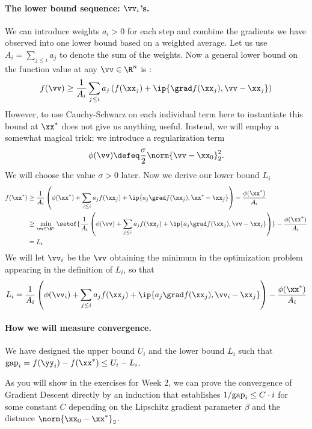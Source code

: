 \paragraph{The lower bound sequence: $\vv_i$'s.}
We can introduce weights $a_i > 0$ for each step and combine the
gradients we have observed into one lower bound based on a weighted
average. Let us use $A_i = \sum_{j \leq i} a_j$ to denote the sum of
the weights. Now a general lower bound on the function value at any
$\vv \in \R^n$ is
:
\[
 f(\vv)
 \geq
 \frac{1}{A_i}
 \sum_{j \leq i} a_j \left(  f(\xx_j)
   + \ip{\grad
     f(\xx_j) , \vv - \xx_j}
   \right)
 \]
However, to use Cauchy-Schwarz on each individual term here to
instantiate this bound at $\xx^*$ does not give us anything useful.
Instead, we will employ a somewhat magical trick: we introduce a
regularization term
\[
  \phi(\vv) \defeq \frac{\sigma}{2} \norm{ \vv -
    \xx_0}_2^2
  .
\]
We will choose the value $\sigma > 0$ later.
Now  we derive our lower bound $L_i$
\begin{align*}
 f(\xx^*)
 &\geq
   \frac{1}{A_i}
    \left(
\phi(\xx^*)
 +
 \sum_{j \leq i} a_j  f(\xx_j)
   + \ip{ a_j\grad
     f(\xx_j) , \xx^* - \xx_j}
\right)
 -
\frac{\phi(\xx^*)}{A_i}
   \\
  &\geq
    \min_{\vv \in \R^n} \setof{
   \frac{1}{A_i}
    \left(
\phi(\vv)
 +
 \sum_{j \leq i} a_j  f(\xx_j)
   + \ip{ a_j\grad
     f(\xx_{j}) ,\vv - \xx_j}
 \right)
    }
    -
    \frac{\phi(\xx^*)}{A_i}
  \\
  &= L_i
\end{align*}
We will let $\vv_i$ be the $\vv$ obtaining the minimum in the
optimization problem appearing in the definition of $L_i$, so that
\[
  L_i
  =
  \frac{1}{A_i}
  \left(
    \phi(\vv_i)
    +
    \sum_{j \leq i} a_j  f(\xx_j)
    + \ip{ a_j\grad
      f(\xx_{j}) ,\vv_i - \xx_j}
  \right)
  -
  \frac{\phi(\xx^*)}{A_i}
\]
\paragraph{How we will measure convergence.}
We have designed the upper bound $U_i$ and the lower bound $L_i$ such
that $\gap_i = f(\yy_i)-f(\xx^*) \leq U_i - L_i$.

As you will show in the exercises for Week 2, we can prove the
convergence of Gradient Descent directly by an induction that
establishes $1/\text{gap}_i \leq C \cdot i $ for some constant $C$ depending
on the Lipschitz gradient parameter $\beta$ and the distance $\norm{\xx_0
 - \xx^*}_2$.

